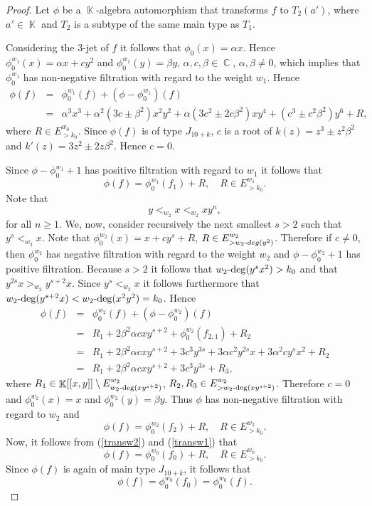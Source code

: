 \documentclass[noend]{amsproc}
\theoremstyle{definition}
\DeclareMathOperator{\C}{\mathbb{C}}
\DeclareMathOperator{\K}{\mathbb{K}}
\DeclareMathOperator{\dash}{\!\textnormal{-}\!}
\begin{document}
\begin{proof}
Let $\phi$ be a $\K$-algebra automorphism that transforms $f$ to $T_2(a')$,
where $a'\in\K$ and $T_2$ is a subtype of the same main type as $T_1$.

Considering the $3$-jet of $f$ it follows that $\phi_0(x)=\alpha x$. Hence
$\phi_0^{w_1}(x)=\alpha x+cy^2$ and $\phi_0^{w_1}(y)=\beta y$,
$\alpha,c,\beta\in\C$, $\alpha,\beta\neq 0$, which implies that $\phi^{w_1}_0$
has non-negative filtration with regard to the weight $w_1$. Hence
\begin{eqnarray*}
\phi(f)&=&\phi^{w_1}_0(f)+(\phi-\phi^{w_1}_0)(f)\\
&=&\alpha^3x^3+\alpha^2(3c\pm\beta^2)x^2y^2+\alpha(3c^2\pm2 c\beta^2)xy^4
+(c^3\pm c^2\beta^2)y^6+R,
\end{eqnarray*}
where $R\in E^{w_0}_{>k_0}$. Since $\phi(f)$ is of type $J_{10+k}$, $c$ is a
root of $k(z)=z^3\pm z^2\beta^2$ and $k'(z)=3z^2\pm2 z\beta^2$. Hence $c=0$.

Since $\phi-\phi_0^{w_1}+1$ has positive filtration with regard to $w_1$ it
follows that
\begin{equation}\label{transw2}
\phi(f) = \phi_0^{w_1}(f_1) + R,\quad R\in E^{w_1}_{>k_0}.
\end{equation}
Note that
\begin{equation}\label{orderw1}
y<_{w_2}x<_{w_2}xy^n,
\end{equation}
for all $n\ge 1$. We, now, consider recursively the next smallest $s>2$ such
that $y^s<_{w_2}x$. Note that $\phi_0^{w_2}(x)=x+cy^s+R$,
$R\in E^{w_2}_{>w_2\dash deg(y^2)}$. Therefore if $c\neq 0$, then
$\phi_0^{w_2}$ has negative filtration with regard to the weight $w_2$ and
$\phi-\phi_0^{w_2}+1$ has positive filtration. Because $s>2$ it follows that
$w_2\dash\deg(y^sx^2)>k_0$ and that $y^{2s}x>_{w_2}y^{s+2}x$. Since
$y^s<_{w_2}x$ it follows furthermore that
$w_2\dash\deg(y^{s+2}x)<w_2\dash\deg(x^2y^2)=k_0$. Hence
\begin{eqnarray*}
\phi(f) &=& \phi_0^{w_2}(f)+(\phi-\phi_0^{w_2})(f)\\
&=& R_1+2\beta^2\alpha c xy^{s+2}+\phi_0^{w_2}(f_{2,1})+R_2\\
&=&R_1+2\beta^2\alpha c xy^{s+2}+ 3 c^3y^{3s}+ 3\alpha c^2y^{2s}x
+3\alpha^2 cy^sx^2+R_2\\
&=&R_1+2\beta^2\alpha c xy^{s+2}+ 3c^3y^{3s}+R_3,
\end{eqnarray*}
where $R_1\in\K[[x,y]]\setminus E^{w_2}_{w_2\dash\deg(xy^{s+2})}$,
$R_2, R_3\in E^{w_2}_{>w_2\dash\deg(xy^{s+2})}$. Therefore $c=0$ and
$\phi_0^{w_2}(x)=x$ and $\phi_0^{w_2}(y)=\beta y$. Thus $\phi$ has non-negative
filtration with regard to $w_2$ and
\begin{equation}\label{transw1}
\phi(f) = \phi_0^{w_2}(f_2)+R,\quad R\in E^{w_2}_{>k_0}.
\end{equation}
Now, it follows from (\ref{transw2}) and (\ref{transw1}) that
\begin{equation*}
\phi(f) = \phi_0^{w_0}(f_0)+R,\quad R\in E^{w_0}_{>k_0}.
\end{equation*}
Since $\phi(f)$ is again of main type $J_{10+k}$, it follows that
\begin{equation*}
\phi(f) = \phi_0^{w_0}(f_0)=\phi_0^{w_0}(f).
\end{equation*}


\end{proof}
\end{document}
